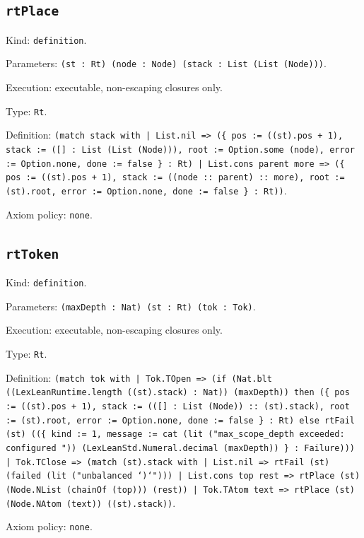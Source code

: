\documentclass[11pt]{article}
\begin{document}
\subsection*{\texttt{rtPlace}}
\noindent Kind: \texttt{definition}.\par
\noindent Parameters: \texttt{(st : Rt) (node : Node) (stack : List (List (Node)))}.\par
\noindent Execution: executable, non-escaping closures only.\par
\noindent Type: \texttt{Rt}.\par
\noindent Definition: \texttt{(match stack with | List.nil => (\{ pos := ((st).pos + 1), stack := ([] : List (List (Node))), root := Option.some (node), error := Option.none, done := false \} : Rt) | List.cons parent more => (\{ pos := ((st).pos + 1), stack := ((node :: parent) :: more), root := (st).root, error := Option.none, done := false \} : Rt))}.\par
\noindent Axiom policy: \texttt{none}.\par
\subsection*{\texttt{rtToken}}
\noindent Kind: \texttt{definition}.\par
\noindent Parameters: \texttt{(maxDepth : Nat) (st : Rt) (tok : Tok)}.\par
\noindent Execution: executable, non-escaping closures only.\par
\noindent Type: \texttt{Rt}.\par
\noindent Definition: \texttt{(match tok with | Tok.TOpen => (if (Nat.blt ((LexLeanRuntime.length ((st).stack) : Nat)) (maxDepth)) then (\{ pos := ((st).pos + 1), stack := (([] : List (Node)) :: (st).stack), root := (st).root, error := Option.none, done := false \} : Rt) else rtFail (st) ((\{ kind := 1, message := cat (lit ("max\_scope\_depth exceeded: configured ")) (LexLeanStd.Numeral.decimal (maxDepth)) \} : Failure))) | Tok.TClose => (match (st).stack with | List.nil => rtFail (st) (failed (lit ("unbalanced `)`"))) | List.cons top rest => rtPlace (st) (Node.NList (chainOf (top))) (rest)) | Tok.TAtom text => rtPlace (st) (Node.NAtom (text)) ((st).stack))}.\par
\noindent Axiom policy: \texttt{none}.\par
\end{document}
